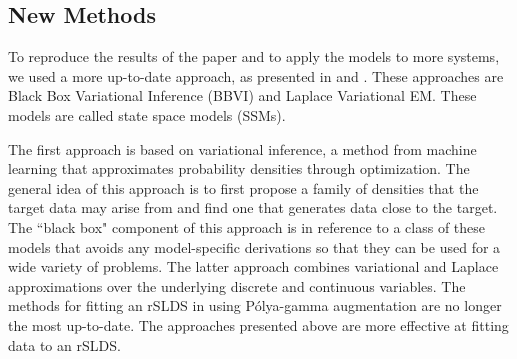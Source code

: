 \subsection{New Methods}

To reproduce the results of the paper and to apply the models to more systems, we used a more up-to-date approach, as presented in \cite{blei_variational_2017} and \cite{zoltowski_unifying_2020}. These approaches are Black Box Variational Inference (BBVI) and Laplace Variational EM. These models are called state space models (SSMs).

The first approach is based on variational inference, a method from machine learning that approximates probability densities through optimization. The general idea of this approach is to first propose a family of densities that the target data may arise from and find one that generates data close to the target. The ``black box" component of this approach is in reference to a class of these models that avoids any model-specific derivations so that they can be used for a wide variety of problems. The latter approach combines variational and Laplace approximations over the underlying discrete and continuous variables. The methods for fitting an rSLDS in \cite{linderman_bayesian_2017} using Pólya-gamma augmentation are no longer the most up-to-date. The approaches presented above are more effective at fitting data to an rSLDS.

